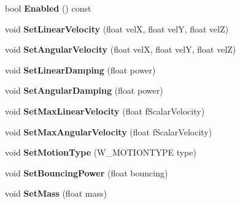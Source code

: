 \begin{DoxyCompactItemize}
\item 
bool {\bfseries Enabled} () const \hypertarget{class_w_rigid_body_a9f723946568b16f259a038e337f0bd4e}{}\label{class_w_rigid_body_a9f723946568b16f259a038e337f0bd4e}

\item 
void {\bfseries Set\+Linear\+Velocity} (float velX, float velY, float velZ)\hypertarget{class_w_rigid_body_a9c4d2b560b0c7feac74ad4c4172892e1}{}\label{class_w_rigid_body_a9c4d2b560b0c7feac74ad4c4172892e1}

\item 
void {\bfseries Set\+Angular\+Velocity} (float velX, float velY, float velZ)\hypertarget{class_w_rigid_body_aaa3b08e7fca02c97c9cd728b88a68350}{}\label{class_w_rigid_body_aaa3b08e7fca02c97c9cd728b88a68350}

\item 
void {\bfseries Set\+Linear\+Damping} (float power)\hypertarget{class_w_rigid_body_a0490705cdaabc8173780ce91fb876869}{}\label{class_w_rigid_body_a0490705cdaabc8173780ce91fb876869}

\item 
void {\bfseries Set\+Angular\+Damping} (float power)\hypertarget{class_w_rigid_body_a3893ea128174aa9e3158b6d17af1de1e}{}\label{class_w_rigid_body_a3893ea128174aa9e3158b6d17af1de1e}

\item 
void {\bfseries Set\+Max\+Linear\+Velocity} (float f\+Scalar\+Velocity)\hypertarget{class_w_rigid_body_a30476647faf9aa2e35624b6068a1bc29}{}\label{class_w_rigid_body_a30476647faf9aa2e35624b6068a1bc29}

\item 
void {\bfseries Set\+Max\+Angular\+Velocity} (float f\+Scalar\+Velocity)\hypertarget{class_w_rigid_body_a83fb17135a260ea1b7c17ac02d60afe7}{}\label{class_w_rigid_body_a83fb17135a260ea1b7c17ac02d60afe7}

\item 
void {\bfseries Set\+Motion\+Type} (W\+\_\+\+M\+O\+T\+I\+O\+N\+T\+Y\+PE type)\hypertarget{class_w_rigid_body_a407218f44b65951dc342c78941a7c01f}{}\label{class_w_rigid_body_a407218f44b65951dc342c78941a7c01f}

\item 
void {\bfseries Set\+Bouncing\+Power} (float bouncing)\hypertarget{class_w_rigid_body_abe9df999d5d75fb3ab532e42850f5f44}{}\label{class_w_rigid_body_abe9df999d5d75fb3ab532e42850f5f44}

\item 
void {\bfseries Set\+Mass} (float mass)\hypertarget{class_w_rigid_body_a336d37085aa66a45596a14c965a0d600}{}\label{class_w_rigid_body_a336d37085aa66a45596a14c965a0d600}


\end{DoxyCompactItemize}
